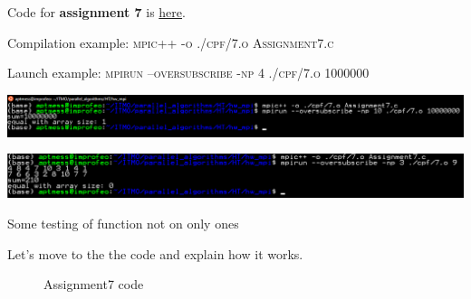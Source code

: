 \documentclass[%
12pt, %
final, %
oneside, %
onecolumn, %
centertags]{article} %
\theoremstyle{plain}
\theoremstyle{definition}
\theoremstyle{remark}
\begin{document}
Code for \textbf{assignment 7} is \href{https:\//github.com/aptmess/parallel_algorithms/blob/master/HT/hw_mpi/Assignment7.c}{here}.

Compilation example: \textsc{mpic++ -o ./cpf/7.o Assignment7.c}

Launch example: \textsc{mpirun --oversubscribe -np 4 ./cpf/7.o 1000000}

\begin{center}
\includegraphics[scale=0.5]{7.1.png}
\end{center}

\begin{center}
\includegraphics[scale=0.55]{7_t.png}

Some testing of function not on only ones
\end{center}

Let's move to the the code and explain how it works.

\begin{figure}[h!]
\centering
{} 


Assignment7 code
\end{figure}
\end{document}
